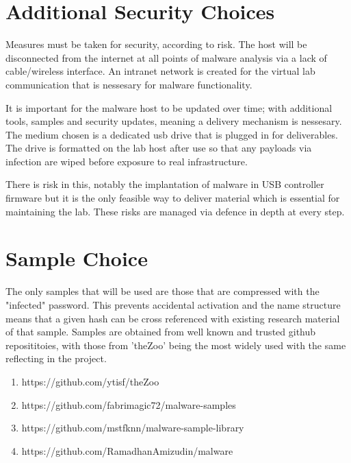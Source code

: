 
\section{Additional Security Choices}
Measures must be taken for security, according to risk. The host will be disconnected from the internet at all points of malware analysis via a lack of cable/wireless interface. An intranet network is created for the virtual lab communication that is nessesary for malware functionality.

It is important for the malware host to be updated over time; with additional tools, samples and security updates, meaning a delivery mechanism is nessesary. The medium chosen is a dedicated usb drive that is plugged in for deliverables. The drive is formatted on the lab host after use so that 
any payloads via infection are wiped before exposure to real infrastructure. 

There is risk in this, notably the implantation of malware in USB controller firmware but it is the only feasible way to deliver material which is essential for maintaining the lab. These risks are managed via defence in depth at every step.


\section{Sample Choice}
The only samples that will be used are those that are compressed with the "infected" password. This prevents accidental activation and the name structure means that a given hash can be cross referenced with existing research material of that sample. 
Samples are obtained from well known and trusted github reposititoies, with those from 'theZoo' being the most widely used with the same reflecting in the project.

\begin{enumerate}
    \item https://github.com/ytisf/theZoo
    \item https://github.com/fabrimagic72/malware-samples
    \item https://github.com/mstfknn/malware-sample-library
    \item https://github.com/RamadhanAmizudin/malware
\end{enumerate}



